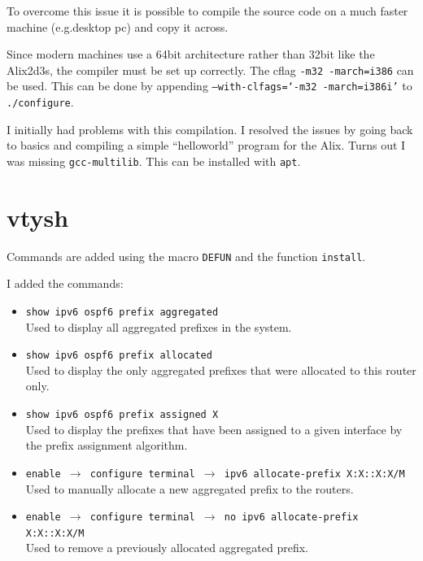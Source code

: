 To overcome this issue it is possible to compile the source code on a much
faster machine (e.g.\@ desktop pc) and copy it across. 

Since modern machines use a 64bit architecture rather than 32bit like the
Alix2d3s, the compiler must be set up correctly. The cflag \texttt{-m32
-march=i386} can be used. This can be done by appending
\texttt{--with-clfags=`-m32 -march=i386i'} to \texttt{\@./configure}.

I initially had problems with this compilation. I resolved the issues by going
back to basics and compiling a simple ``helloworld'' program for the
Alix.  Turns out I was missing \texttt{gcc-multilib}. This can be installed
with \texttt{apt}.

\chapter{vtysh}
\label{vtysh}
Commands are added using the macro \texttt{DEFUN} and the function \texttt{install}.

I added the commands:
\begin{itemize}
	\item \texttt{show ipv6 ospf6 prefix aggregated} \\
		Used to display all aggregated prefixes in the system.
	\item \texttt{show ipv6 ospf6 prefix allocated} \\ 
		Used to display the only aggregated prefixes that were allocated to this
		router only.
	\item \texttt{show ipv6 ospf6 prefix assigned X} \\
		Used to display the prefixes that have been assigned to a given interface
		by the prefix assignment algorithm. 


	\item \texttt{enable $\rightarrow$ configure terminal 
		$\rightarrow$ ipv6 allocate-prefix X:X::X:X/M} \\
		Used to manually allocate a new aggregated prefix to the routers.
	\item \texttt{enable $\rightarrow$ configure terminal
		$\rightarrow$ no ipv6 allocate-prefix X:X::X:X/M} \\
		Used to remove a previously allocated aggregated prefix.
\end{itemize}
\pagebreak

